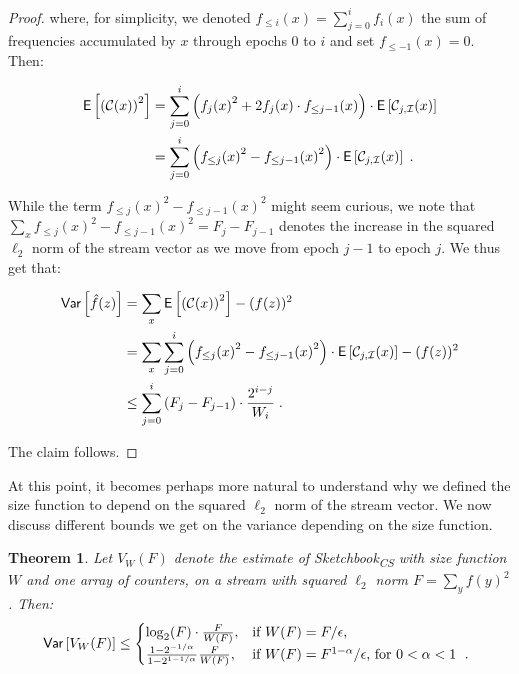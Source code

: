 \documentclass[sigconf]{acmart}
\newtheorem{theorem}{Theorem}[section]
\newcommand{\sketch}{Sketchbook}
\newcommand{\sketchcs}{\sketch\textsubscript{CS}\xspace}
\begin{document}
\begin{proof}
where, for simplicity, we denoted $f_{\leq {i}}(x) =  \sum_{j=0}^{i}  f_i(x)$ the sum of frequencies accumulated by $x$ through epochs $0$ to $i$ and set $f_{\leq -1}(x)=0$. Then:

\begin{align*}
\mathsf{E}\left[ \left(\mathcal{C}(x)\right)^2 \right] &= \sum_{j=0}^i   \left({f_j(x) }^2  + 2 f_j(x) \cdot f_{\leq j-1}(x)\right) \cdot \mathsf{E}\left[  \mathcal{C}_{j,\mathcal{I}}(x) \right]  \\
&=  \sum_{j=0}^i   \left({f_{\leq j}(x) }^2  - {f_{\leq j-1}(x) }^2\right) \cdot \mathsf{E}\left[  \mathcal{C}_{j,\mathcal{I}}(x) \right]\;.
\end{align*}


While the term ${f_{\leq j}(x) }^2  - {f_{\leq j-1}(x) }^2$ might seem curious, we note that $\sum_x{f_{\leq j}(x) }^2  - {f_{\leq j-1}(x) }^2 = F_{j} - F_{j-1}$ denotes the increase in the squared $\ell_2$ norm of the stream vector as we move from epoch $j-1$ to epoch $j$. We thus get that:


\begin{align*}
	\textsf{Var}\left[ \hat{f}(z) \right] &= \sum_x \mathsf{E}\left[ \left(\mathcal{C}(x)\right)^2 \right] - (f(z))^2\\
	&= \sum_x \sum_{j=0}^i   \left({f_{\leq j}(x) }^2  - {f_{\leq j-1}(x) }^2\right) \cdot \mathsf{E}\left[  \mathcal{C}_{j,\mathcal{I}}(x) \right] -  (f(z))^2\\
	&\leq  \sum_{j=0}^{i}  \left(F_{j} - F_{j-1}\right) \cdot \frac{2^{i-j}}{W_i}\;.
\end{align*}

The claim follows.
\end{proof}


At this point, it becomes perhaps more natural to understand why we defined the size function to depend on the squared $\ell_2$ norm of the stream vector. We now discuss different bounds we get on the variance depending on the size function.

\begin{theorem}\label{thm:cs-w} 	 Let $V_W(F)$  denote the estimate of \sketchcs  with size function $W$ and one array of counters, on a stream with squared $\ell_2$ norm $F = \sum_y f(y)^2$. Then:
$$\textsf{Var}\left[ V_{W}(F) \right] \leq  \begin{cases}
	\log_2(F) \cdot \frac{F}{W(F)}, & \text{if $W(F)=F/\epsilon$,}\\
	\frac{1-2^{-1/\alpha}}{1-2^{1-1/\alpha}}\frac{F}{W(F)}, & \text{if $W(F)=F^{1-\alpha}/\epsilon$, for $0<\alpha < 1$ \;. }
\end{cases}$$
\end{theorem}
\end{document}
